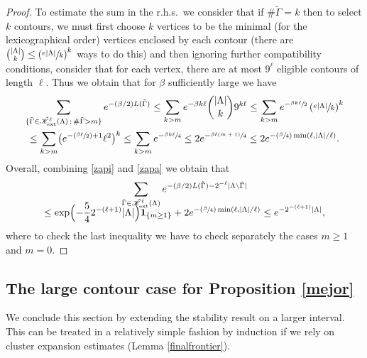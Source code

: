 \documentclass[JEP,XML,SOM,Unicode, NoFloatCountersInSection]{cedram}
\let\mathcal\mathscr
\newcommand{\sep}{\,:\,}
\newcommand{\Psfrac}[2]{(\sfrac{#1}{#2})}
\numberwithin{equation}{section}
\theoremstyle{plain}
\theoremstyle{definition}
\newcommand{\ext}{\mathrm{ext}}
\newcommand{\ind}{\mathbf{1}}
\newcommand{\cK}{{\ensuremath{\mathcal K}} }
\newcommand{\gb}{\beta}
\newcommand{\gG}{\Gamma}
\newcommand{\gL}{\Lambda}
\begin{document}
\begin{proof}
To estimate the sum in the r.h.s.\, we consider that if $\# \tilde \gG=k$ then to select $k$ contours, we must first choose
$k$ vertices to be the minimal (for the lexicographical order) vertices enclosed by each contour
(there are $\binom{|\gL|}{k}\le \left(\sfrac{e |\gL|}{k}\right)^k$ ways to do this)
and then ignoring further compatibility conditions, consider that for each vertex, there are at most $9^{\ell}$ eligible contours of length $\ell$.
Thus we obtain that for $\gb$ sufficiently large we have
\begin{multline} \label{zapa}
\sum_{\{ \tilde \gG\in \tilde \cK^{\ell}_{\ext}(\gL)\sep \# \tilde \gG > m \}} e^{-(\gb/2) L(\tilde\gG)}\le
\sum_{k> m} e^{-\gb k\ell} \binom{|\gL|}{k} 9^{k\ell}
\le \sum_{k> m} e^{-\sfrac{\gb k\ell}{2}} \left(\sfrac{e |\gL|}{k}\right)^k\\
\le \sum_{k> m}\bigl(e^{-\Psfrac{\gb \ell}{2}+1} \ell^2 \bigr)^k
\le \sum_{k> m} e^{-\sfrac{\gb k\ell}{4}}\le 2 e^{-\sfrac{\gb \ell(m+1)}{4}} \le 2e^{-\Psfrac{\gb}{4}\min \left(\ell, |\gL|/\ell \right)}.
\end{multline}
Overall, combining \eqref{zapi} and \eqref{zapa} we obtain that
\begin{multline*}
\sum_{\tilde \gG\in \tilde \cK^{\ell}_{\ext}(\gL)}e^{-(\gb/2) L(\tilde\gG)-2^{-\ell} |\gL\setminus \bar \gG|}\\[-10pt]
\le
\exp\Bigl(-\frac{5}{4}2^{-(\ell+1)} |\gL|\Bigr)\ind_{\{m\ge 1\}}
+ 2e^{-\Psfrac{\gb}{4}\min \left(\ell, |\gL|/\ell \right)} \le e^{-2^{-(\ell+1)} |\gL|},
\end{multline*}
where to check the last inequality we have to check separately the cases $m\ge 1$ and $m=0$.
\end{proof}

\subsection{The large contour case for Proposition \ref{mejor}}\label{mejorplus}

We conclude this section by extending the stability result on a larger interval.
This can be treated in a relatively simple fashion by induction if we rely on cluster expansion estimates (Lemma \ref{finalfrontier}).
\end{document}
